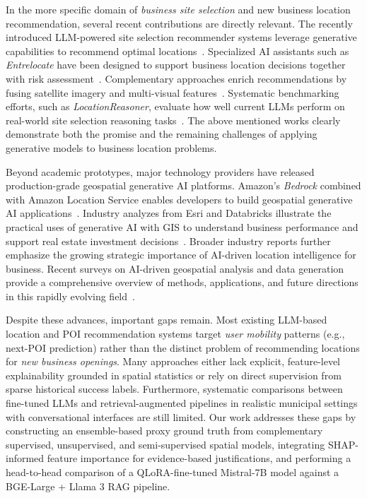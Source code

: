 \documentclass[pdflatex,sn-mathphys-num]{sn-jnl}%
\theoremstyle{thmstyleone}%
\theoremstyle{thmstyletwo}%
\theoremstyle{thmstylethree}%
\begin{document}
In the more specific domain of \emph{business site selection} and new business location recommendation, several recent contributions are directly relevant. 
The recently introduced LLM-powered site selection recommender systems leverage generative capabilities to recommend optimal locations~\cite{Gao2024LLMSiteSelection}. 
Specialized AI assistants such as \textit{Entrelocate} have been designed to support business location decisions together with risk assessment~\cite{Bozdag202574}. 
Complementary approaches enrich recommendations by fusing satellite imagery and multi-visual features~\cite{Suvon2026}.
Systematic benchmarking efforts, such as \textit{LocationReasoner}, evaluate how well current LLMs perform on real-world site selection reasoning tasks~\cite{Koda2025LocationReasoner}. The above mentioned works clearly demonstrate both the promise and the remaining challenges of applying generative models to business location problems.

Beyond academic prototypes, major technology providers have released production-grade geospatial generative AI platforms. Amazon's \textit{Bedrock} combined with Amazon Location Service enables developers to build geospatial generative AI applications~\cite{AWS2023GeospatialGenAI}. 
Industry analyzes from Esri and Databricks illustrate the practical uses of generative AI with GIS to understand business performance and support real estate investment decisions~\cite{Esri2025GenAIBusinessPerformance, Databricks2025GeospatialGenAIRealEstate}. Broader industry reports further emphasize the growing strategic importance of AI-driven location intelligence for business. Recent surveys on AI-driven geospatial analysis and data generation provide a comprehensive overview of methods, applications, and future directions in this rapidly evolving field~\cite{Hochmair2025AdvancingGeoAI}.

Despite these advances, important gaps remain. Most existing LLM-based location and POI recommendation systems target \emph{user mobility} patterns (e.g., next-POI prediction) rather than the distinct problem of recommending locations for \emph{new business openings}. Many approaches either lack explicit, feature-level explainability grounded in spatial statistics or rely on direct supervision from sparse historical success labels. Furthermore, systematic comparisons between fine-tuned LLMs and retrieval-augmented pipelines in realistic municipal settings with conversational interfaces are still limited. Our work addresses these gaps by constructing an ensemble-based proxy ground truth from complementary supervised, unsupervised, and semi-supervised spatial models, integrating SHAP-informed feature importance for evidence-based justifications, and performing a head-to-head comparison of a QLoRA-fine-tuned Mistral-7B model against a BGE-Large + Llama 3 RAG pipeline. 
\end{document}
